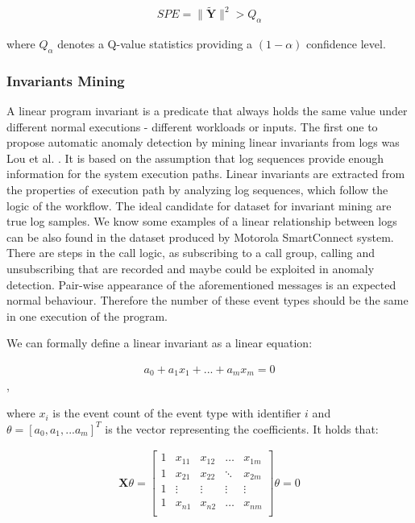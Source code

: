 \begin{gather}
    SPE = \parallel \mathbf{\widetilde{Y}} \parallel^2 > Q_{\alpha} 
\end{gather}
 
 where $Q_{\alpha}$ denotes a Q-value statistics providing a $(1 - \alpha)$ confidence level. 
 


 \subsubsection{Invariants Mining}
 \label{section:lrInvariantMining}
 
A linear program invariant is a predicate that always holds the same value under different normal executions - different workloads or inputs. The first one to propose automatic anomaly detection by mining linear invariants from logs was Lou et al. \cite{lou2010}. It is based on the assumption that log sequences provide enough information for the system execution paths. Linear invariants are extracted from the properties of execution path by analyzing log sequences, which follow the logic of the workflow. The ideal candidate for dataset for invariant mining are true log samples. We know some examples of a linear relationship between logs can be also found in the dataset produced by Motorola SmartConnect system. 
There are steps in the call logic, as subscribing to a call group, calling and unsubscribing that are recorded and maybe could be exploited in anomaly detection. Pair-wise appearance of the aforementioned messages is an expected normal behaviour. Therefore the number of these event types should be the same in one execution of the program. 

We can formally define a linear invariant as a linear equation: 

\begin{gather}
    a_0 + a_1 x_1 + ... + a_m x_m = 0
\end{gather},

where $x_i$ is the event count of the event type with identifier $i$ and $\theta = [a_0, a_1, ... a_m]^T$ is the vector representing the coefficients. It holds that: 

\begin{gather}
\mathbf{X} \theta = 
\begin{bmatrix}
1 & x_{11} & x_{12} & \hdots & x_{1m}\\
1 & x_{21} & x_{22} & \ddots & x_{2m}\\
1 & \vdots & \vdots & \vdots &\vdots \\
1 & x_{n1} & x_{n2} & \hdots & x_{nm}\\
\end{bmatrix}
\theta = 0
\end{gather}

